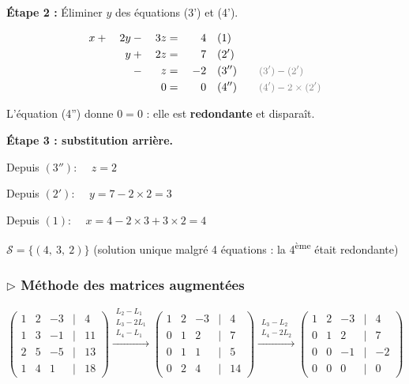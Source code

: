 \documentclass[12pt,a4paper]{article}
\newcommand{\ann}[1]{\qquad\textcolor{opcolor}{\text{\small #1}}}
\begin{document}
\textbf{Étape 2 :} Éliminer $y$ des équations (3') et (4').

\begin{alignat*}{4}
  x &{}+{}& 2y  &{}-{}& 3z &{}={}& 4   &\quad (1)\\
    &     & y   &{}+{}& 2z &{}={}& 7   &\quad (2')\\
    &     &     &{}-{}& z  &{}={}& -2  &\quad (3'') \ann{$(3')-(2')$}\\
    &     &     &     & 0  &{}={}& 0   &\quad (4'') \ann{$(4')-2\times(2')$}
\end{alignat*}

L'équation (4'') donne $0=0$ : elle est \textbf{redondante} et disparaît.

\textbf{Étape 3 : substitution arrière.}

Depuis $(3'')$: $\quad \boxed{z=2}$

Depuis $(2')$: $\quad y = 7 - 2\times 2 = \boxed{3}$

Depuis $(1)$: $\quad x = 4 - 2\times 3 + 3\times 2 = \boxed{4}$

\begin{solbox}
$\mathcal{S} = \{(4,\ 3,\ 2)\}$ \hfill (solution unique malgré 4 équations : la 4\textsuperscript{ème} était redondante)
\end{solbox}

\subsubsection*{$\triangleright$ Méthode des matrices augmentées}

\[
\begin{pmatrix}
1 & 2 & -3 & \mid & 4 \\
1 & 3 & -1 & \mid & 11 \\
2 & 5 & -5 & \mid & 13 \\
1 & 4 & 1 & \mid & 18
\end{pmatrix}
\xrightarrow{\substack{L_2-L_1 \\ L_3-2L_1 \\ L_4-L_1}}
\begin{pmatrix}
1 & 2 & -3 & \mid & 4 \\
0 & 1 & 2 & \mid & 7 \\
0 & 1 & 1 & \mid & 5 \\
0 & 2 & 4 & \mid & 14
\end{pmatrix}
\xrightarrow{\substack{L_3-L_2 \\ L_4-2L_2}}
\begin{pmatrix}
1 & 2 & -3 & \mid & 4 \\
0 & 1 & 2 & \mid & 7 \\
0 & 0 & -1 & \mid & -2 \\
0 & 0 & 0 & \mid & 0
\end{pmatrix}
\]
\end{document}

